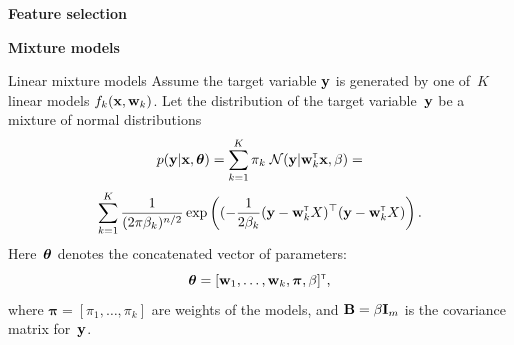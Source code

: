\documentclass{beamer}
\newcommand{\argmax}{\mathop{\rm arg\,max}\limits}
\begin{document}
\begin{frame}
\vfill
\begin{center}
{\Large \bf Feature selection}
\end{center}
\vfill
\end{frame}
\begin{frame}
\vfill
\begin{center}
{\Large \bf Mixture models}
\end{center}
\vfill
\end{frame}
%
%
\begin{frame}{Linear mixture models}%
Assume the target variable ${\mathbf{y}}$ is generated by one of~$K$ linear models $f_{k}({\mathbf{x}}, {\mathbf{w}}_k)$. Let the distribution of the target variable~${\mathbf{y}}$ be a mixture of normal distributions
\[
p({\mathbf{y}}|{\mathbf{x}}, \boldsymbol{\theta}) = \sum_{k=1}^{K}\pi_k\;\mathcal{N}({\mathbf{y}}|{\mathbf{w}}_k^{\text{\tiny\sffamily\upshape\mdseries T}}{\mathbf{x}},\beta) = \]
\[ \sum_{k=1}^K
\frac{1}{(2\pi\beta_k)^{n/2}} \exp \left(
( -\frac{1}{2\beta_k}({\mathbf{y}} - {\mathbf{w}}_k^{\text{\tiny\sffamily\upshape\mdseries T}} X)^{\top}({\mathbf{y}} - {\mathbf{w}}_k^{\text{\tiny\sffamily\upshape\mdseries T}} X) \right).
\]
Here~$\boldsymbol{\theta}$ denotes the concatenated vector of parameters:
\[
\boldsymbol{\theta} = [{\mathbf{w}}_1,\dots,{\mathbf{w}}_k,\boldsymbol{\pi},\beta]^{\text{\tiny\sffamily\upshape\mdseries T}},
\]
where $\boldsymbol{\pi} = [\pi_1,\dots,\pi_k]$ are weights of the models,
and ${\mathbf{B}} = \beta \mathbf{I}_m$ is the covariance matrix for~${\mathbf{y}}$.


\end{frame}
\end{document}
